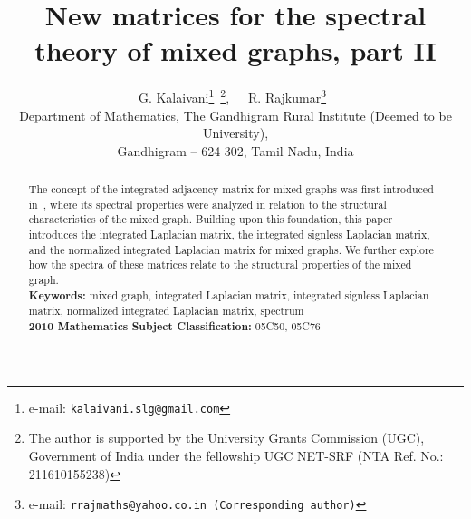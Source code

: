 \documentclass[12pt]{article}
\numberwithin{equation}{section}
\begin{document}
	\vspace{-2cm}
	\title{\LARGE\bf New matrices for the spectral theory of mixed graphs, part II}
	\author{G. Kalaivani\footnote{e-mail: {\tt kalaivani.slg@gmail.com}}~\footnote{The author is supported by the University Grants Commission (UGC), Government of India under the fellowship UGC NET-SRF (NTA Ref. No.: 211610155238)},\ \ \
		R. Rajkumar\footnote{e-mail: {\tt rrajmaths@yahoo.co.in (Corresponding author)}}\ \\
		{\footnotesize Department of Mathematics, The Gandhigram Rural Institute (Deemed to be University),}\\ \footnotesize{Gandhigram -- 624 302, Tamil Nadu, India}\\[3mm]
	}
	\date{}
	\maketitle
	\begin{abstract}
	The concept of the integrated adjacency matrix for mixed graphs was first introduced in~\cite{Kalaimatrices1}, where its spectral properties were analyzed in relation to the structural characteristics of the mixed graph. Building upon this foundation, this paper introduces the integrated Laplacian matrix, the integrated signless Laplacian matrix, and the normalized integrated Laplacian matrix for mixed graphs. We further explore how the spectra of these matrices relate to the structural properties of the mixed graph.\\ 

	\noindent	\textbf{Keywords:} mixed graph, integrated Laplacian matrix, integrated signless Laplacian matrix, normalized integrated Laplacian matrix, spectrum \\
		\textbf{2010 Mathematics Subject Classification:}  05C50, 05C76
		
	\end{abstract}
	
\end{document}
